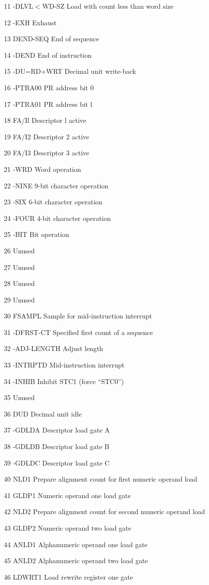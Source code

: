 11 -DLVL$<$WD-SZ Load with count less than word size

12 -EXH Exhaust

13 DEND-SEQ End of sequence

14 -DEND End of instruction

15 -DU=RD+WRT Decimal unit write-back

16 -PTRA00 PR address bit 0

17 -PTRA01 PR address bit l

18 FA/Il Descriptor l active

19 FA/I2 Descriptor 2 active

20 FA/I3 Descriptor 3 active

21 -WRD Word operation

22 -NINE 9-bit character operation

23 -SIX 6-bit character operation

24 -FOUR 4-bit character operation

25 -BIT Bit operation

26 Unused

27 Unused

28 Unused

29 Unused

30 FSAMPL Sample for mid-instruction interrupt

31 -DFRST-CT Specified first count of a sequence

32 -ADJ-LENGTH Adjust length

33 -INTRPTD Mid-instruction interrupt

34 -INHIB Inhibit STC1 (force {``}STC0'')

35 Unused

36 DUD Decimal unit idle

37 -GDLDA Descriptor load gate A

38 -GDLDB Descriptor load gate B

39 -GDLDC Descriptor load gate C

40 NLD1 Prepare alignment count for first numeric operand load

41 GLDP1 Numeric operand one load gate

42 NLD2 Prepare alignment count for second numeric operand load

43 GLDP2 Numeric operand two load gate

44 ANLD1 Alphanumeric operand one load gate

45 ANLD2 Alphanumeric operand two load gate

46 LDWRT1 Load rewrite register one gate

